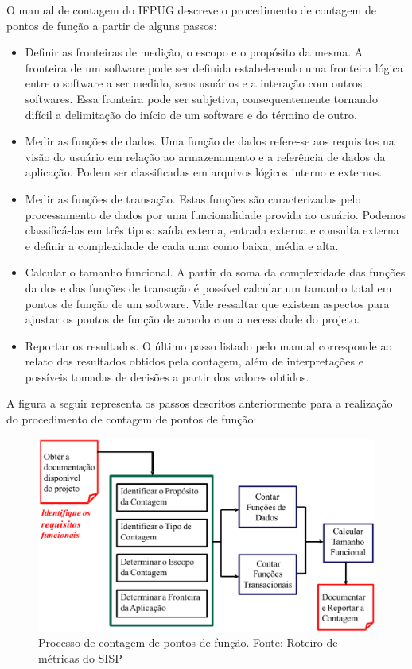 O manual de contagem do IFPUG descreve o procedimento de contagem de pontos de função a partir de alguns passos:

\begin{itemize}

\item Definir as fronteiras de medição, o escopo e o propósito da mesma. A fronteira de um software pode ser definida estabelecendo uma fronteira lógica entre o software a ser medido, seus usuários e a interação com outros softwares. Essa fronteira pode ser subjetiva, consequentemente tornando difícil a delimitação do início de um software e do término de outro.

\item Medir as funções de dados. Uma função de dados refere-se aos requisitos na visão do usuário em relação ao armazenamento e a referência de dados da aplicação. Podem ser classificadas em arquivos lógicos interno e externos.

\item Medir as funções de transação. Estas funções são caracterizadas pelo processamento de dados por uma funcionalidade provida ao usuário. Podemos classificá-las em três tipos: saída externa, entrada externa e consulta externa e definir a complexidade de cada uma como baixa, média e alta.

\item Calcular o tamanho funcional. A partir da soma da complexidade das funções da dos e das funções de transação é possível calcular um tamanho total em pontos de função de um software. Vale ressaltar que existem aspectos para ajustar os pontos de função de acordo com a necessidade do projeto.

\item Reportar os resultados. O último passo listado pelo manual corresponde ao relato dos resultados obtidos pela contagem, além de interpretações e possíveis tomadas de decisões a partir dos valores obtidos.

\end{itemize}

A figura a seguir representa os passos descritos anteriormente para a realização do procedimento de contagem de pontos de função:

\begin{figure}[h]
	\centering
	\label{fig01}
		\includegraphics[keepaspectratio=true,scale=0.4]{figuras/fig01.eps}
	\caption{Processo de contagem de pontos de função. Fonte: Roteiro de métricas do SISP}
\end{figure}


